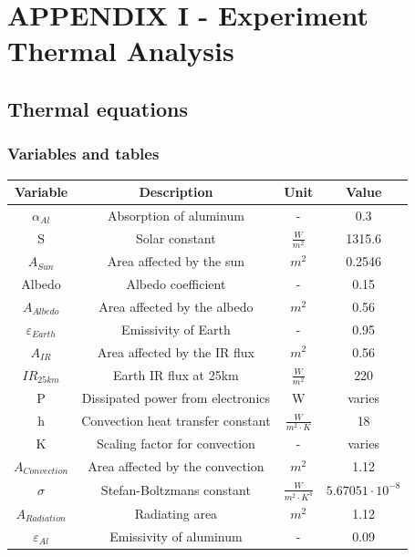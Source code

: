 \newpage
\section{APPENDIX I - Experiment Thermal Analysis} \label{sec:appI}
\subsection{Thermal equations}

\subsubsection{Variables and tables}
\begin{table}[H]
    \centering
    \begin{tabular}{|c|c|c|c|}
        \hline
        Variable & Description & Unit & Value \\ \hline
        $\alpha_{Al}$ & Absorption of aluminum & - & 0.3 \\ \hline
        S & Solar constant & $\frac{W}{m^2}$ & 1315.6 \\ \hline
        $A_{Sun}$ & Area affected by the sun & $m^2$ & 0.2546 \\ \hline
        Albedo & Albedo coefficient & - & 0.15 \\ \hline
        $A_{Albedo}$ & Area affected by the albedo & $m^2$ & 0.56 \\ \hline
        $\varepsilon_{Earth}$ & Emissivity of Earth & - & 0.95 \\ \hline
        $A_{IR}$ & Area affected by the IR flux & $m^2$ & 0.56 \\ \hline
        $IR_{25km}$ & Earth IR flux at 25km & $\frac{W}{m^2}$ & 220 \\ \hline
        P & Dissipated power from electronics & W & varies \\ \hline
        h & Convection heat transfer constant & $\frac{W}{m^2 \cdot K}$ & 18 \\ \hline
        K & Scaling factor for convection & - & varies \\ \hline
        $A_{Convection}$ & Area affected by the convection & $m^2$ & 1.12 \\ \hline
        $\sigma$ & Stefan-Boltzmans constant & $\frac{W}{m^2 \cdot K^4}$ & $5.67051 \cdot 10^{-8}$ \\ \hline
        $A_{Radiation}$ & Radiating area & $m^2$ & 1.12\\ \hline
        $\varepsilon_{Al}$ & Emissivity of aluminum & - & 0.09 \\ \hline

\end{tabular}
\end{table}
